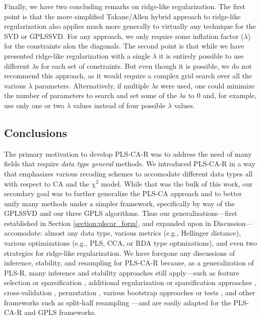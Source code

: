 \documentclass[12pt]{article}
\begin{document}
Finally, we have two concluding remarks on ridge-like regularization.
The first point is that the more simplified Takane/Allen hybrid approach
to ridge-like regularization also applies much more generally to
virtually any technique for the SVD or GPLSSVD. For any approach, we
only require some inflation factor (\(\lambda\)) for the constraints
alon the diagonals. The second point is that while we have presented
ridge-like regularization with a single \(\lambda\) it is entirely
possible to use different \(\lambda\)s for each set of constraints. But
even though it is possible, we do not recommend this approach, as it
would require a complex grid search over all the various \(\lambda\)
parameters. Alternatively, if multiple \(\lambda\)s were used, one could
minimize the number of parameters to search and set some of the
\(\lambda\)s to 0 and, for example, use only one or two \(\lambda\)
values instead of four possible \(\lambda\) values.

\hypertarget{conclusions}{%
\subsection{Conclusions}\label{conclusions}}

The primary motivation to develop PLS-CA-R was to address the need of
many fields that require \textit{data type general} methods. We
introduced PLS-CA-R in a way that emphasizes various recoding schemes to
accomodate different data types all with respect to CA and the
\(\chi^2\) model. While that was the bulk of this work, our secondary
goal was to further generalize the PLS-CA approach and to better unify
many methods under a simpler framework, specifically by way of the
GPLSSVD and our three GPLS algorithms. Thus our generalizations---first
established in Section \ref{section:plscar_form}, and expanded upon in
Discussion---accomodate: almost any data type, various metrics (e.g.,
Hellinger distance), various optimizations (e.g., PLS, CCA, or RDA type
optmizations), and even two strategies for ridge-like regularization. We
have foregone any discussions of inference, stability, and resampling
for PLS-CA-R because, as a generalization of PLS-R, many inference and
stability approaches still apply---such as feature selection or
sparsification \citep{sutton_sparse_2018}, additional regularization or
sparsification approaches
\citep{le_floch_significant_2012-1, guillemot2019constrained, tenenhaus_variable_2014, tenenhaus_regularized_2011},
cross-validation
\citep{wold_principal_1987, rodriguez-perez_overoptimism_2018, kvalheim_number_2019, abdi_partial_2010-1},
permutation \citep{berry_permutation_2011}, various bootstrap
\citep{efron_bootstrap_1979, chernick_bootstrap_2008} approaches
\citep{abdi_partial_2010-1, takane_regularized_2009-1} or tests
\citep{mcintosh_partial_2004, krishnan_partial_2011}, and other
frameworks such as split-half resampling
\citep{strother_quantitative_2002-1, kovacevic2013revisiting, strother2004optimizing}---and
are easily adapted for the PLS-CA-R and GPLS frameworks.
\end{document}
